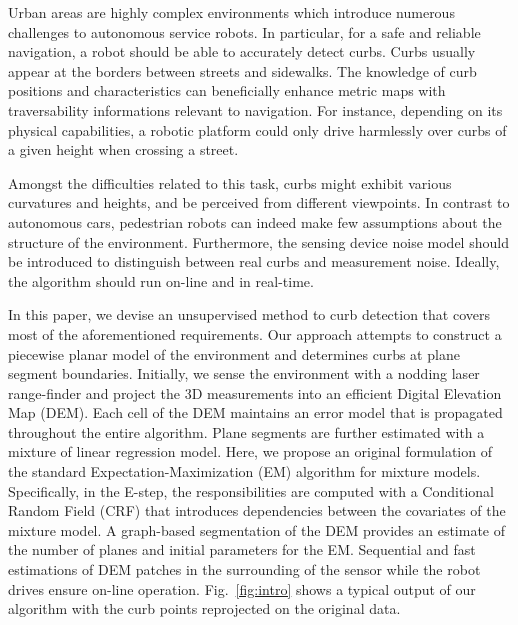 Urban areas are highly complex environments which introduce numerous challenges
to autonomous service robots. In particular, for a safe and reliable navigation,
a robot should be able to accurately detect curbs. Curbs usually appear at the
borders between streets and sidewalks. The knowledge of curb positions and
characteristics can beneficially enhance metric maps with traversability
informations relevant to navigation. For instance, depending on its physical
capabilities, a robotic platform could only drive harmlessly over curbs of a
given height when crossing a street.

Amongst the difficulties related to this task, curbs might exhibit various
curvatures and heights, and be perceived from different viewpoints. In contrast
to autonomous cars, pedestrian robots can indeed make few assumptions about
the structure of the environment. Furthermore, the sensing device noise model
should be introduced to distinguish between real curbs and measurement noise.
Ideally, the algorithm should run on-line and in real-time.

In this paper, we devise an unsupervised method to curb detection that covers
most of the aforementioned requirements. Our approach attempts to construct a
piecewise planar model of the environment and determines curbs at plane segment
boundaries. Initially, we sense the environment with a nodding laser
range-finder and project the 3D measurements into an efficient Digital Elevation
Map (DEM). Each cell of the DEM maintains an error model that is propagated
throughout the entire algorithm. Plane segments are further estimated with a
mixture of linear regression model. Here, we propose an original formulation of
the standard Expectation-Maximization (EM) algorithm for mixture models.
Specifically, in the E-step, the responsibilities are computed with a
Conditional Random Field (CRF) that introduces dependencies between the
covariates of the mixture model. A graph-based segmentation of the DEM provides
an estimate of the number of planes and initial parameters for the EM.
Sequential and fast estimations of DEM patches in the surrounding of the sensor
while the robot drives ensure on-line operation. Fig.~\ref{fig:intro} shows a
typical output of our algorithm with the curb points reprojected on the original
data.

